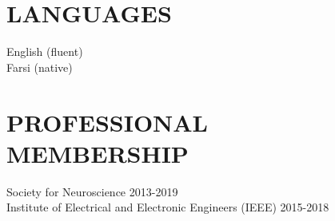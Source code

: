 \documentclass[margin, 10pt]{res}
\begin{document}
\begin{resume}
\section{LANGUAGES}
English (fluent) \\
Farsi (native)\
\section { PROFESSIONAL  \\ MEMBERSHIP} 
Society for Neuroscience \hfill 2013-2019\\ 
Institute of Electrical and Electronic Engineers (IEEE)  \hfill 2015-2018\\ 
\end{resume}
\end{document}

